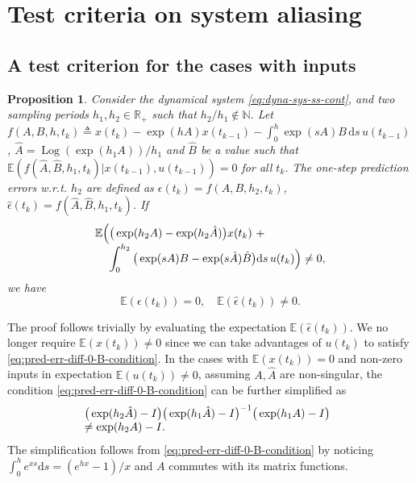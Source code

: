 \documentclass[letterpaper,10pt,journal,final]{IEEEtran}
\newtheorem{proposition}[theorem]{Proposition}
\theoremstyle{definition}
\theoremstyle{remark}
\newcommand{\Log}{\operatorname{Log}}
\begin{document}
\section{Test criteria on system aliasing}
\label{appdix:test-criteria-sys-alias}

\subsection{A test criterion for the cases with inputs}
\label{appdix:subsec:test-criteria-case-input}

\begin{proposition}
  \label{prop:pred-error-diff-distribution-B}
  Consider the dynamical system \eqref{eq:dyna-sys-ss-cont}, and two sampling periods
  $h_1, h_2 \in \mathbb{R}_+$ such that $h_2/h_1 \notin \mathbb{N}$. Let
  $f(A,B,h,t_k) \triangleq x(t_k) - \exp(hA) x(t_{k-1}) - \int_0^h \exp(sA)B
  \,\mathrm{d}s\, u(t_{k-1})$, $\hat{A} = \Log(\exp(h_1 A))/h_1$ and $\hat{B}$ be a value
  such that $\mathbb{E}(f(\hat{A}, \hat{B}, h_1, t_k) | x(t_{k-1}), u(t_{k-1})) = 0$
  for all $t_k$. The one-step prediction errors w.r.t. $h_2$ are defined as
  $\epsilon(t_k) = f(A,B,h_2,t_k)$,
  $\hat{\epsilon}(t_k) = f(\hat{A}, \hat{B}, h_1, t_k)$.  If
  \begin{equation}
    \label{eq:pred-err-diff-0-B-condition}
    \begin{array}{l@{}l}
      \mathbb{E}\Big(
      &\big( \exp(h_2 A) - \exp(h_2 \hat{A}) \big) x(t_k)\ + \\
      &\displaystyle\int_0^{h_2} \big( \exp(sA)B -
      \exp(s\hat{A})\hat{B} \big) \mathrm{d}s\, u(t_k) \Big) \neq 0,
    \end{array}
  \end{equation}
  we have
  \begin{equation*}
    \mathbb{E}(\epsilon(t_k)) = 0, \quad
    \mathbb{E}(\hat{\epsilon}(t_k)) \neq 0.
  \end{equation*}
\end{proposition}
The proof follows trivially by evaluating the expectation
$\mathbb{E}(\hat{\epsilon}(t_k))$. We no longer require $\mathbb{E}(x(t_k)) \neq 0$
since we can take advantages of $u(t_k)$ to satisfy
\eqref{eq:pred-err-diff-0-B-condition}. In the cases with $\mathbb{E}(x(t_k)) = 0$
and non-zero inputs in expectation $\mathbb{E}(u(t_k)) \neq 0$, assuming $A, \hat{A}$
are non-singular, the condition \eqref{eq:pred-err-diff-0-B-condition} can be further
simplified as
\begin{equation}
  \label{eq:pred-err-diff-0-B-condition-special}
  \begin{array}{@{}l@{}l}
    &\big( \exp(h_2 \hat{A}) -I \big)
      \big( \exp(h_1 \hat{A}) -I \big)^{-1}
      \big( \exp(h_1 {A}) -I \big) \\
    &\neq \exp(h_2 A) - I.
  \end{array}
\end{equation}
The simplification follows from \eqref{eq:pred-err-diff-0-B-condition} by noticing
$\int_0^h e^{x s} \mathrm{d}s = (e^{h x} - 1)/x$ and $A$ commutes with its matrix functions.
\end{document}
